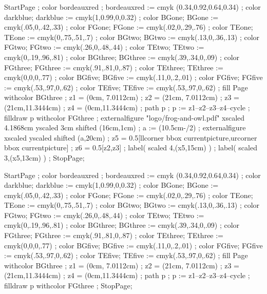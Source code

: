 	StartPage ;
		color bordeauxred ; bordeauxred := cmyk (0.34,0.92,0.64,0.34) ;
		color darkblue; darkblue := cmyk(1,0.99,0,0.32) ;
		color BGone; BGone := cmyk(.05,0,.42,.33) ;
		color FGone; FGone := cmyk(.02,0,.29,.76) ;
		color TEone; TEone := cmyk(0,.75,.51,.7) ;
		color BGtwo; BGtwo := cmyk(.13,0,.36,.13) ;
		color FGtwo; FGtwo := cmyk(.26,0,.48,.44) ;
		color TEtwo; TEtwo := cmyk(0,.19,.96,.81) ;
		color BGthree; BGthree := cmyk(.39,.34,0,.09) ;
		color FGthree; FGthree := cmyk(.91,.81,0,.87) ;
		color TEthree; TEthree := cmyk(0,0,0,.77) ;
		color BGfive; BGfive := cmyk(.11,0,.2,.01) ;
		color FGfive; FGfive := cmyk(.53,.97,0,.62) ;
		color TEfive; TEfive := cmyk(.53,.97,0,.62) ;
		fill Page withcolor BGthree ;
		z1 = (0cm, 7.0112cm) ;
		z2 = (21cm, 7.0112cm) ;
		z3 = (21cm,11.3444cm) ;
		z4 = (0cm,11.3444cm) ;
		path p ; p := z1--z2--z3--z4--cycle ;
		filldraw p withcolor FGthree ;
		externalfigure "logo/frog-and-owl.pdf" xscaled 4.1868cm yscaled 3cm shifted (16cm,1cm) ;
		a := (10.5cm-/2) ;
		externalfigure  xscaled  yscaled  shifted (a,20cm) ;
		z5 = 0.5[llcorner bbox currentpicture,urcorner bbox currentpicture] ;
        z6 = 0.5[z2,z3] ;
		label( scaled 4,(x5,15cm) ) ;
		label( scaled 3,(x5,13cm) ) ;
	StopPage;
\stopuseMPgraphic

    StartPage ;
        color bordeauxred ; bordeauxred := cmyk (0.34,0.92,0.64,0.34) ;
        color darkblue; darkblue := cmyk(1,0.99,0,0.32) ;
		color BGone; BGone := cmyk(.05,0,.42,.33) ;
		color FGone; FGone := cmyk(.02,0,.29,.76) ;
		color TEone; TEone := cmyk(0,.75,.51,.7) ;
		color BGtwo; BGtwo := cmyk(.13,0,.36,.13) ;
		color FGtwo; FGtwo := cmyk(.26,0,.48,.44) ;
		color TEtwo; TEtwo := cmyk(0,.19,.96,.81) ;
		color BGthree; BGthree := cmyk(.39,.34,0,.09) ;
		color FGthree; FGthree := cmyk(.91,.81,0,.87) ;
		color TEthree; TEthree := cmyk(0,0,0,.77) ;
		color BGfive; BGfive := cmyk(.11,0,.2,.01) ;
		color FGfive; FGfive := cmyk(.53,.97,0,.62) ;
		color TEfive; TEfive := cmyk(.53,.97,0,.62) ;
        fill Page withcolor BGthree ;
        z1 = (0cm, 7.0112cm) ;
        z2 = (21cm, 7.0112cm) ;
        z3 = (21cm,11.3444cm) ;
        z4 = (0cm,11.3444cm) ;
        path p ; p := z1--z2--z3--z4--cycle ;
		filldraw p withcolor FGthree ;
    StopPage;
\stopuseMPgraphic



\stopenvironment
